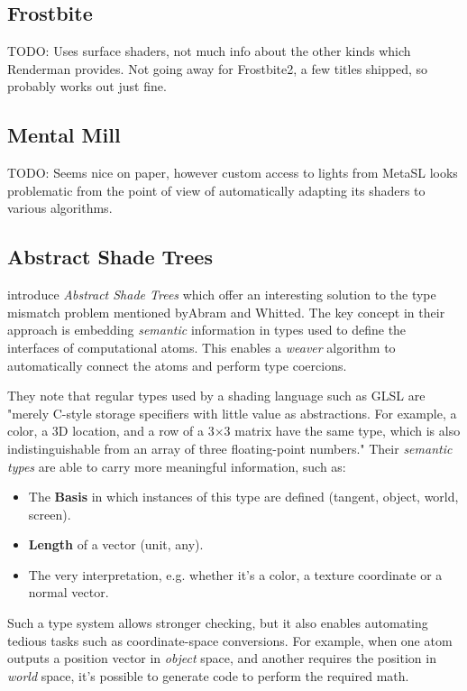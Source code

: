 \subsection{Frostbite}

TODO: Uses surface shaders, not much info about the other kinds which Renderman provides. Not going away for Frostbite2, a few titles shipped, so probably works out just fine.

\subsection{Mental Mill}

TODO: Seems nice on paper, however custom access to lights from MetaSL looks problematic from the point of view of automatically adapting its shaders to various algorithms.

\subsection{Abstract Shade Trees}

\citet{mcguire2006shadetrees} introduce \emph{Abstract Shade Trees} which offer an interesting solution to the type mismatch problem mentioned byAbram and Whitted. The key concept in their approach is embedding \emph{semantic} information in types used to define the interfaces of computational atoms. This enables a \emph{weaver} algorithm to automatically connect the atoms and perform type coercions.

They note that regular types used by a shading language such as GLSL are "merely C-style storage specifiers with little value as abstractions. For example, a color, a 3D location, and a row of a 3×3 matrix have the same type, which is also indistinguishable from an array of three floating-point numbers." Their \emph{semantic types} are able to carry more meaningful information, such as:
\begin{itemize}
\item The \textbf{Basis} in which instances of this type are defined (tangent, object, world, screen).
\item \textbf{Length} of a vector (unit, any).
\item The very interpretation, e.g. whether it’s a color, a texture coordinate or a normal vector.
\end{itemize}

Such a type system allows stronger checking, but it also enables automating tedious tasks such as coordinate-space conversions. For example, when one atom outputs a position vector in \emph{object} space, and another requires the position in \emph{world} space, it's possible to generate code to perform the required math.

